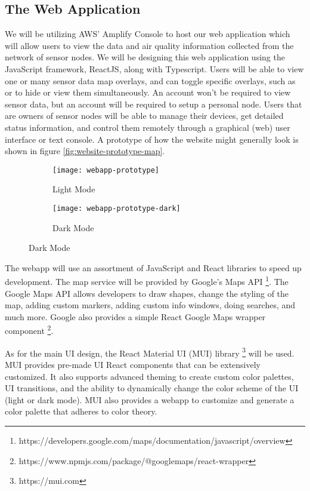 \subsection{The Web Application}
We will be utilizing AWS' Amplify Console to host our web application which will allow users to view
the data and air quality information collected from the network of sensor nodes. We will be
designing this web application using the JavaScript framework, ReactJS, along with Typescript. Users
will be able to view one or many sensor data map overlays, and can toggle specific overlays, such as
\sdo or \ndo to hide or view them simultaneously. An account won't be required to view sensor data,
but an account will be required to setup a personal node. Users that are owners of sensor nodes will
be able to manage their devices, get detailed status information, and control them remotely through
a graphical (web) user interface or text console. A prototype of how the website might generally
look is shown in figure \ref{fig:website-prototype-map}. 

\begin{figure}
  \centering
  \caption{Web Application Map View Prototype}
  \label{fig:website-prototype-map} 

  \begin{subfigure}[b]{\textwidth}
    \texttt{[image: webapp-prototype]}
    \caption{Light Mode}
    \label{fig:website-prototype-map-light} 
  \end{subfigure}

  \hfill

  \begin{subfigure}[b]{\textwidth}
    \texttt{[image: webapp-prototype-dark]}
    \caption{Dark Mode}
    \label{fig:website-prototype-map-dark} 
  \end{subfigure}
\end{figure}

The webapp will use an assortment of JavaScript and React libraries to speed up development. The map
service will be provided by Google's Maps API
\footnote{https://developers.google.com/maps/documentation/javascript/overview}. The Google Maps API
allows developers to draw shapes, change the styling of the map, adding custom markers, adding
custom info windows, doing searches, and much more. Google also provides a simple React Google Maps
wrapper component \footnote{https://www.npmjs.com/package/@googlemaps/react-wrapper}.

As for the main UI design, the React Material UI (MUI) library \footnote{https://mui.com} will be
used. MUI provides pre-made UI React components that can be extensively customized. It also supports
advanced theming to create custom color palettes, UI transitions, and the ability to dynamically
change the color scheme of the UI (light or dark mode). MUI also provides a webapp to customize and
generate a color palette that adheres to color theory.

